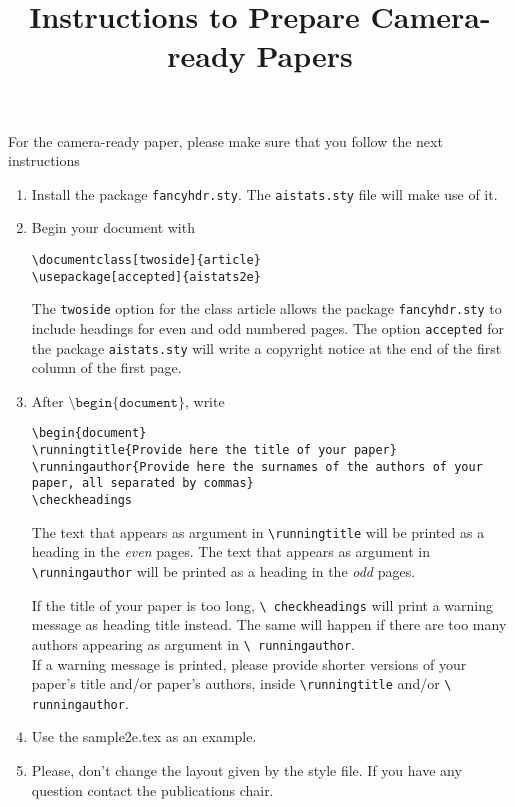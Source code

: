 \documentclass[a4paper,10pt]{article}
\title{Instructions to Prepare Camera-ready Papers}
\author{}
\date{}
\begin{document}
\maketitle

For the camera-ready paper, please make sure that you follow the
next instructions

\begin{enumerate}
    \item Install the package \texttt{fancyhdr.sty}. The
    \texttt{aistats.sty} file will make use of it.
    \item Begin your document with
    \begin{flushleft}
    \texttt{\textbackslash documentclass[twoside]\{article\}}\\
    \texttt{\textbackslash usepackage[accepted]\{aistats2e\}}
    \end{flushleft}
    The \texttt{twoside} option for the class article allows the
    package \texttt{fancyhdr.sty} to include headings for even and
    odd numbered pages. The option \texttt{accepted} for the package
    \texttt{aistats.sty} will write a copyright notice at the end of
    the first column of the first page.
    \item After $\texttt{\textbackslash
    begin\{document\}}$, write
    \begin{flushleft}
    \texttt{\textbackslash begin\{document\}}\\
    \texttt{\textbackslash runningtitle\{Provide here the title of your
    paper\}}\\
    \texttt{\textbackslash runningauthor\{Provide here the surnames of the authors of your paper, all separated by
    commas\}}\\
    \texttt{\textbackslash checkheadings}
    \end{flushleft}
    The text that appears as argument in \texttt{\textbackslash runningtitle}
    will be printed as a heading in the \emph{even} pages. The text that appears as argument in \texttt{\textbackslash runningauthor}
    will be printed as a heading in the \emph{odd} pages.

    If the title of your paper is too long, \texttt{\textbackslash
    checkheadings} will print a warning message as heading title
    instead. The same will happen if there are too many authors
    appearing as argument in \texttt{\textbackslash
    runningauthor}.\\

    If a warning message is printed, please provide shorter versions
    of your paper's title and/or paper's authors, inside \texttt{\textbackslash runningtitle} and/or \texttt{\textbackslash
    runningauthor}.

    \item Use the sample2e.tex as an example.

    \item Please, don't change the layout given by the style file. If you have any
    question contact the publications chair.


\end{enumerate}
\end{document}
